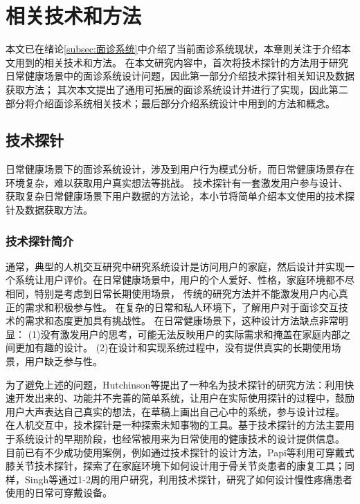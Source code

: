 \chapter{相关技术和方法}
本文已在绪论\ref{subsec:面诊系统}中介绍了当前面诊系统现状，本章则关注于介绍本文用到的相关技术和方法。
在本文研究内容中，首次将技术探针的方法用于研究日常健康场景中的面诊系统设计问题，因此第一部分介绍技术探针相关知识及数据获取方法；
其次本文提出了通用可拓展的面诊系统设计并进行了实现，因此第二部分将介绍面诊系统相关技术；最后部分介绍系统设计中用到的方法和概念。

\section{技术探针}
日常健康场景下的面诊系统设计，涉及到用户行为模式分析，而日常健康场景存在环境复杂，难以获取用户真实想法等挑战。
技术探针有一套激发用户参与设计、获取复杂日常健康场景下用户数据的方法论，本小节将简单介绍本文使用的技术探针及数据获取方法。
\subsection{技术探针简介}

通常，典型的人机交互研究中研究系统设计是访问用户的家庭，然后设计并实现一个系统让用户评价。在日常健康场景中，用户的个人爱好、性格，家庭环境都不尽相同，特别是考虑到日常长期使用场景，
传统的研究方法并不能激发用户内心真正的需求和积极参与性。
在复杂的日常和私人环境下，了解用户对于面诊交互技术的需求和态度更加具有挑战性。
在日常健康场景下，这种设计方法缺点非常明显\cite{Hutchinson2003Technology}：
(1)没有激发用户的思考，可能无法反映用户的实际需求和掩盖在家庭内部之间更加有趣的设计。
(2)在设计和实现系统过程中，没有提供真实的长期使用场景，用户缺乏参与性。

为了避免上述的问题，Hutchinson等\cite{Hutchinson2003Technology}提出了一种名为技术探针的研究方法：利用快速开发出来的、功能并不完善的简单系统，让用户在实际使用探针的过程中，鼓励用户大声表达自己真实的想法，在草稿上画出自己心中的系统，参与设计过程。
在人机交互中，技术探针是一种探索未知事物的工具。基于技术探针的方法主要用于系统设计的早期阶段\cite{turmo2020training}，也经常被用来为日常使用的健康技术的设计提供信息。
目前已有不少成功使用案例，例如通过技术探针的设计方法，Papi等\cite{papi2015knee}利用可穿戴式膝关节技术探针，探索了在家庭环境下如何设计用于骨关节炎患者的康复工具；同样，Singh等\cite{singh2017supporting}通过1-2周的用户研究，利用技术探针，研究了如何设计慢性疼痛患者使用的日常可穿戴设备。

